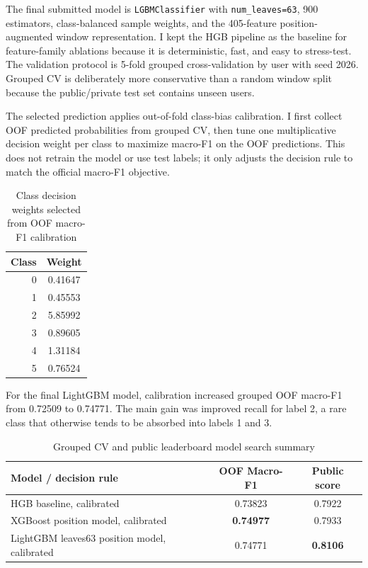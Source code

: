 \documentclass[11pt]{article}
\begin{document}
The final submitted model is \texttt{LGBMClassifier} with \texttt{num\_leaves=63},
900 estimators, class-balanced sample weights, and the 405-feature
position-augmented window representation. I kept the HGB pipeline as the
baseline for feature-family ablations because it is deterministic, fast, and
easy to stress-test. The validation protocol is 5-fold grouped cross-validation
by user with seed 2026. Grouped CV is deliberately more conservative than a
random window split because the public/private test set contains unseen users.

The selected prediction applies out-of-fold class-bias calibration. I first
collect OOF predicted probabilities from grouped CV, then tune one multiplicative
decision weight per class to maximize macro-F1 on the OOF predictions. This does
not retrain the model or use test labels; it only adjusts the decision rule to
match the official macro-F1 objective.

\begin{table}[H]
\centering
\caption{Class decision weights selected from OOF macro-F1 calibration\label{tab:calibration}}
\begin{tabular}{rc}
\toprule
Class & Weight \\
\midrule
0 & 0.41647 \\
1 & 0.45553 \\
2 & 5.85992 \\
3 & 0.89605 \\
4 & 1.31184 \\
5 & 0.76524 \\
\bottomrule
\end{tabular}
\end{table}

For the final LightGBM model, calibration increased grouped OOF macro-F1 from
0.72509 to 0.74771. The main gain was improved recall for label 2, a rare class
that otherwise tends to be absorbed into labels 1 and 3.

\begin{table}[H]
\centering
\caption{Grouped CV and public leaderboard model search summary\label{tab:cv}}
\begin{tabular}{lcc}
\toprule
Model / decision rule & OOF Macro-F1 & Public score \\
\midrule
HGB baseline, calibrated & 0.73823 & 0.7922 \\
XGBoost position model, calibrated & \textbf{0.74977} & 0.7933 \\
LightGBM leaves63 position model, calibrated & 0.74771 & \textbf{0.8106} \\
\bottomrule
\end{tabular}
\end{table}
\end{document}
